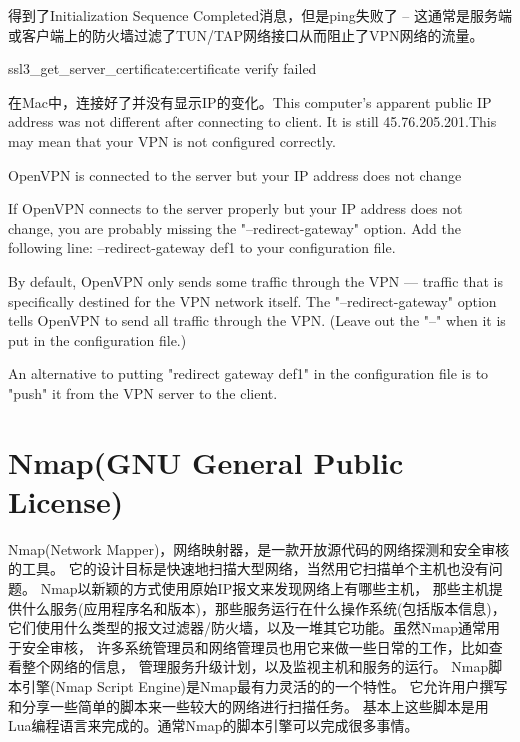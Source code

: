 \documentclass[12pt]{book}
\makeatletter
\numberwithin{dummy}{section}
\theoremstyle{ocrenumbox}
\theoremstyle{blacknumex}
\theoremstyle{blacknumbox}
\theoremstyle{ocrenum}
\renewcommand{\subsubsection}{\@startsection {subsubsection}{3}{\z@}
	{-2ex \@plus -0.1ex \@minus -.2ex}
	{.2ex \@plus.2ex }
	{\normalfont\small\sffamily\bfseries}}
\renewcommand\paragraph{\@startsection{paragraph}{4}{\z@}
	{-2ex \@plus-.2ex \@minus .2ex}
	{.1ex}
	{\normalfont\small\sffamily\bfseries}}
\makeatother
\begin{document}
得到了Initialization Sequence Completed消息，但是ping失败了 -- 这通常是服务端或客户端上的防火墙过滤了TUN/TAP网络接口从而阻止了VPN网络的流量。  

\subsubsection{ssl3\_get\_server\_certificate:certificate verify failed}

在Mac中，连接好了并没有显示IP的变化。This computer's apparent public IP address was not different after connecting to client. It is still 45.76.205.201.This may mean that your VPN is not configured correctly.


\paragraph{OpenVPN is connected to the server but your IP address does not change}

If OpenVPN connects to the server properly but your IP address does not change, you are probably missing the "--redirect-gateway" option. Add the following line:
--redirect-gateway def1 to your configuration file.

By default, OpenVPN only sends some traffic through the VPN — traffic that is specifically destined for the VPN network itself. The "--redirect-gateway" option tells OpenVPN to send all traffic through the VPN. (Leave out the "--" when it is put in the configuration file.)

An alternative to putting "redirect gateway def1" in the configuration file is to "push" it from the VPN server to the client.

\chapter{Nmap(GNU General Public License)}

Nmap(Network Mapper)，网络映射器，是一款开放源代码的网络探测和安全审核的工具。
它的设计目标是快速地扫描大型网络，当然用它扫描单个主机也没有问题。
Nmap以新颖的方式使用原始IP报文来发现网络上有哪些主机，
那些主机提供什么服务(应用程序名和版本)，那些服务运行在什么操作系统(包括版本信息)，
它们使用什么类型的报文过滤器/防火墙，以及一堆其它功能。虽然Nmap通常用于安全审核，
许多系统管理员和网络管理员也用它来做一些日常的工作，比如查看整个网络的信息，
管理服务升级计划，以及监视主机和服务的运行。
Nmap脚本引擎(Nmap Script Engine)是Nmap最有力灵活的的一个特性。
它允许用户撰写和分享一些简单的脚本来一些较大的网络进行扫描任务。
基本上这些脚本是用Lua编程语言来完成的。通常Nmap的脚本引擎可以完成很多事情。
\end{document}
